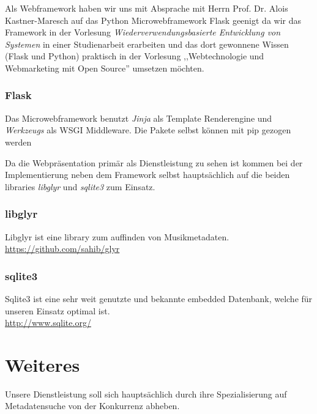 \documentclass[11pt]{scrreprt}
\begin{document}
Als Webframework haben wir uns mit Absprache mit Herrn Prof. Dr. Alois
Kastner-Maresch auf das Python Microwebframework Flask geenigt da wir das
Framework in der Vorlesung \emph{Wiederverwendungsbasierte Entwicklung von
Systemen} in einer Studienarbeit erarbeiten und das dort gewonnene Wissen (Flask
und Python) praktisch in der Vorlesung ,,Webtechnologie und Webmarketing 
mit Open Source'' umsetzen möchten.

\subsection{Flask}
Das Microwebframework benutzt \emph{Jinja} als Template Renderengine und
\emph{Werkzeugs} als WSGI Middleware. Die Pakete selbst können mit pip gezogen
werden


Da die Webpräsentation primär als Dienstleistung zu sehen ist kommen bei der
Implementierung neben dem Framework selbst hauptsächlich auf die beiden
libraries \emph{libglyr} und \emph{sqlite3} zum Einsatz.

\subsection{libglyr}
Libglyr ist eine library zum auffinden von Musikmetadaten. 
\\
    \url{https://github.com/sahib/glyr}


\subsection{sqlite3}
Sqlite3 ist eine sehr weit genutzte und bekannte embedded Datenbank, welche für
unseren Einsatz optimal ist.
\\
\url{http://www.sqlite.org/}

\chapter{Weiteres}
Unsere Dienstleistung soll sich hauptsächlich durch ihre Spezialisierung auf
Metadatensuche von der Konkurrenz abheben. 
\end{document}
